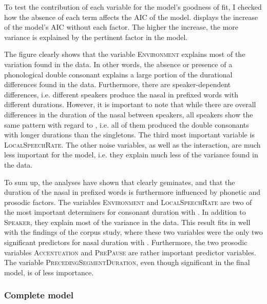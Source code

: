 To test the contribution of each variable for the model's goodness of fit, I checked how the absence of each term affects the AIC of the model.  displays the increase of the model's AIC  without each factor. The higher the increase, the more variance is explained by the pertinent factor in the model.\largerpage[-1]



The figure clearly shows that the variable \textsc{Environment} explains most of the variation found in the data. In other words, the absence or presence of a phonological double consonant explains a large portion of the durational differences found in the data.
Furthermore, there are speaker-dependent differences, i.e. different speakers produce the nasal in prefixed words with different durations. However, it is important to note that while there are overall differences in the duration of the nasal between speakers, all speakers show the same pattern with regard to , i.e. all of them produced the double consonants with longer durations than the singletons. 
The third most important variable is \textsc{LocalSpeechRate}. The other noise variables, as well as the interaction, are much less important for the model, i.e. they explain much less of the variance found in the data.


To sum up, the analyses have shown that  clearly geminates, and that the duration of the nasal in prefixed words is furthermore influenced by phonetic and prosodic factors.
The variables \textsc{Environment} and \textsc{LocalSpeechRate} are two of the most important determiners for consonant duration with . In addition to \textsc{Speaker}, they explain most of the variance in the data. This result fits in well with the findings of the corpus study, where these two variables were the only two significant predictors for nasal duration with . 
Furthermore, the two prosodic variables \textsc{Accentuation} and \textsc{PrePause} are rather important predictor variables. The variable \textsc{PrecedingSegmentDuration}, even though significant in the final model, is of less importance. 



\subsubsection{Complete model}\largerpage[-1]

